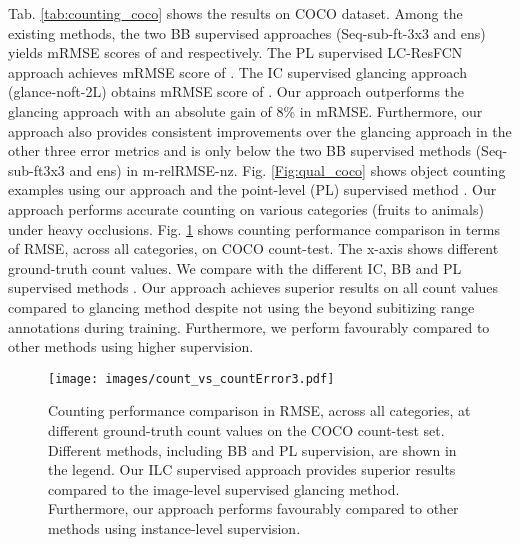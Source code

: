 \documentclass[10pt,twocolumn,letterpaper]{article}
\begin{document}
Tab. \ref{tab:counting_coco} shows the results on COCO dataset. Among the existing methods, the two BB supervised approaches (Seq-sub-ft-3x3 and ens) yields mRMSE scores of  and  respectively. The PL supervised LC-ResFCN approach \cite{WhereAreBlobsECCV18} achieves mRMSE score of . The IC supervised glancing approach (glance-noft-2L) obtains mRMSE score of . Our approach outperforms the glancing approach with an absolute gain of 8\% in mRMSE. Furthermore, our approach  also provides consistent improvements over the glancing approach in the other three error metrics and is only below the two BB supervised methods (Seq-sub-ft3x3 and ens) in m-relRMSE-nz. Fig. \ref{Fig:qual_coco} shows object counting examples using our approach and the point-level (PL) supervised method \cite{WhereAreBlobsECCV18}. Our approach performs accurate counting on various categories (fruits to animals) under heavy occlusions. Fig. \ref{fig:CountVsCountErr} shows counting performance comparison in terms of RMSE, across all categories, on COCO count-test. The x-axis shows different ground-truth count values. We compare with the different IC, BB and PL supervised methods \cite{Chattopadhyay_2017_CVPR, WhereAreBlobsECCV18}. Our approach achieves superior results on all count values compared to glancing method \cite{Chattopadhyay_2017_CVPR} despite not using the beyond subitizing range annotations during training.  Furthermore, we perform favourably compared to other methods using higher supervision.










\begin{figure}[t]
	\texttt{[image: images/count\_vs\_countError3.pdf]}
	\vspace{-0.2cm}
	\caption{Counting performance comparison in RMSE, across all categories, at different ground-truth count values on the COCO count-test set. Different methods, including BB and PL supervision, are shown in the legend. Our ILC supervised approach provides superior results compared to the image-level supervised glancing method. Furthermore, our approach performs favourably compared to other methods using instance-level supervision. }
	\label{fig:CountVsCountErr}
	 \vspace*{-0.3cm}
\end{figure}
       
\end{document}

